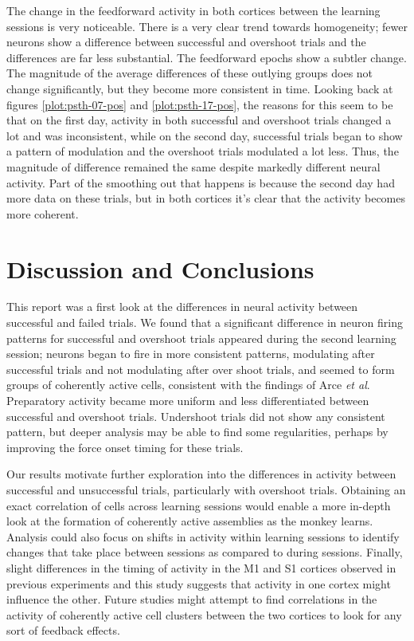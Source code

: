 \documentclass[11pt,a4paper]{article}
\begin{document}
The change in the feedforward activity in both cortices between the learning sessions is very noticeable. There is a very clear trend towards homogeneity; fewer neurons show a difference between successful and overshoot trials and the differences are far less substantial. The feedforward epochs show a subtler change. The magnitude of the average differences of these outlying groups does not change significantly, but they become more consistent in time. Looking back at figures \ref{plot:psth-07-pos} and \ref{plot:psth-17-pos}, the reasons for this seem to be that on the first day, activity in both successful and overshoot trials changed a lot and was inconsistent, while on the second day, successful trials began to show a pattern of modulation and the overshoot trials modulated a lot less. Thus, the magnitude of difference remained the same despite markedly different neural activity. Part of the smoothing out that happens is because the second day had more data on these trials, but in both cortices it's clear that the activity becomes more coherent.

\section{Discussion and Conclusions}
This report was a first look at the differences in neural activity between successful and failed trials. We found that a significant difference in neuron firing patterns for successful and overshoot trials appeared during the second learning session; neurons began to fire in more consistent patterns, modulating after successful trials and not modulating after over shoot trials, and seemed to form groups of coherently active cells, consistent with the findings of Arce \emph{et al}\cite{farce-adaptation}. Preparatory activity became more uniform and less differentiated between successful and overshoot trials. Undershoot trials did not show any consistent pattern, but deeper analysis may be able to find some regularities, perhaps by improving the force onset timing for these trials.

Our results motivate further exploration into the differences in activity between successful and unsuccessful trials, particularly with overshoot trials. Obtaining an exact correlation of cells across learning sessions would enable a more in-depth look at the formation of coherently active assemblies as the monkey learns. Analysis could also focus on shifts in activity within learning sessions to identify changes that take place between sessions as compared to during sessions. Finally, slight differences in the timing of activity in the M1 and S1 cortices observed in previous experiments and this study suggests that activity in one cortex might influence the other. Future studies might attempt to find correlations in the activity of coherently active cell clusters between the two cortices to look for any sort of feedback effects.
\end{document}

